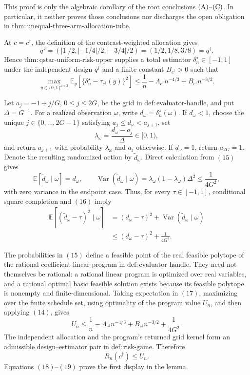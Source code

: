This proof is only the algebraic corollary of the root conclusions
\({\rm(A)}\)--\({\rm(C)}\).  In particular, it neither proves those
conclusions nor discharges the open obligation in
\(\mathrm{thm:unequal\text{-}three\text{-}arm\text{-}allocation\text{-}tube}\).

At \(c=c^\dagger\), the definition of the contrast-weighted allocation gives
\[
 q^\star=(|1|/2,|-1/4|/2,|-3/4|/2)
 =(1/2,1/8,3/8)=q^\dagger.                                  \tag{13}
\]
Hence \(\mathrm{thm:qstar\text{-}uniform\text{-}risk\text{-}upper}\)
supplies a total estimator \(\delta_n^\star\in[-1,1]\) under the independent
design \(q^\dagger\) and a finite constant \(B_{c^\dagger}>0\) such that
\[
 \max_{y\in\{0,1\}^{n\times3}}
 \mathbb E_y\!\left[
 \{\delta_n^\star-\tau_{c^\dagger}(y)\}^2\right]
 \le \frac1n-\Lambda_{c^\dagger}n^{-4/3}
 +B_{c^\dagger}n^{-3/2}.                                    \tag{14}
\]

Let \(a_j=-1+j/G\), \(0\le j\le2G\), be the grid in
\(\mathrm{def:evaluator\text{-}handle}\), and put \(\Delta=G^{-1}\).
For a realized observation \(\omega\), write
\(d_\omega=\delta_n^\star(\omega)\).  If \(d_\omega<1\), choose the unique
\(j\in\{0,\ldots,2G-1\}\) satisfying
\(a_j\le d_\omega<a_{j+1}\), set
\[
 \lambda_\omega=\frac{d_\omega-a_j}{\Delta}\in[0,1),       \tag{15}
\]
and return \(a_{j+1}\) with probability \(\lambda_\omega\) and \(a_j\)
otherwise.  If \(d_\omega=1\), return \(a_{2G}=1\).  Denote the resulting
randomized action by \(\widetilde d_\omega\).  Direct calculation from
\((15)\) gives
\[
 \mathbb E[\widetilde d_\omega\mid\omega]=d_\omega,
 \qquad
 \operatorname{Var}(\widetilde d_\omega\mid\omega)
 =\lambda_\omega(1-\lambda_\omega)\Delta^2
 \le\frac1{4G^2},                                           \tag{16}
\]
with zero variance in the endpoint case.  Thus, for every
\(\tau\in[-1,1]\), conditional square completion and \((16)\) imply
\[
\begin{aligned}
 \mathbb E[(\widetilde d_\omega-\tau)^2\mid\omega]
 &= (d_\omega-\tau)^2+
    \operatorname{Var}(\widetilde d_\omega\mid\omega)\\
 &\le(d_\omega-\tau)^2+\frac1{4G^2}.                         \tag{17}
\end{aligned}
\]

The probabilities in \((15)\) define a feasible point of the real feasible
polytope of the rational-coefficient linear program in
\(\mathrm{def:evaluator\text{-}handle}\).  They need not themselves be
rational: a rational linear program is optimized over real variables, and a
rational optimal basic feasible solution exists because its feasible
polytope is nonempty and finite-dimensional.  Taking expectation in \((17)\),
maximizing over the finite schedule set, using optimality of the program value
\(U_n\), and then applying \((14)\), gives
\[
 U_n\le \frac1n-\Lambda_{c^\dagger}n^{-4/3}
 +B_{c^\dagger}n^{-3/2}+\frac1{4G^2}.                        \tag{18}
\]
The independent allocation and the program's returned grid kernel form an
admissible design--estimator pair in \(\mathrm{def:risk\text{-}game}\).
Therefore
\[
 R_n(c^\dagger)\le U_n.                                     \tag{19}
\]
Equations \((18)\)--\((19)\) prove the first display in the lemma.

